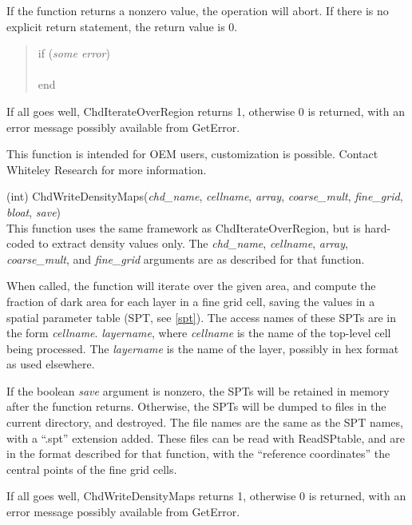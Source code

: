 \begin{description}
If the function returns a nonzero value, the operation will abort.
If there is no explicit return statement, the return value is 0.
\begin{quote}
{\vt if (}{\it some error\/}{\vt )}\\
\hspace*{2em}{\vt return 1}\\
{\vt end}
\end{quote}

If all goes well, {\vt ChdIterateOverRegion} returns 1, otherwise 0 is
returned, with an error message possibly available from {\vt
GetError}.

This function is intended for OEM users, customization is possible. 
Contact Whiteley Research for more information.

\item{(int) \vt ChdWriteDensityMaps({\it chd\_name\/}, {\it cellname\/},
 {\it array\/}, {\it coarse\_mult\/}, {\it fine\_grid\/}, {\it bloat\/},
 {\it save})}\\
This function uses the same framework as {\vt ChdIterateOverRegion},
but is hard-coded to extract density values only.  The {\it
chd\_name\/}, {\it cellname\/}, {\it array\/}, {\it coarse\_mult\/},
and {\it fine\_grid} arguments are as described for that function.

When called, the function will iterate over the given area, and
compute the fraction of dark area for each layer in a fine grid cell,
saving the values in a spatial parameter table (SPT, see \ref{spt}). 
The access names of these SPTs are in the form {\it cellname\/}.{\it
layername\/}, where {\it cellname} is the name of the top-level cell
being processed.  The {\it layername} is the name of the layer,
possibly in hex format as used elsewhere.

If the boolean {\it save} argument is nonzero, the SPTs will be
retained in memory after the function returns.  Otherwise, the SPTs
will be dumped to files in the current directory, and destroyed.  The
file names are the same as the SPT names, with a ``{\vt .spt}''
extension added.  These files can be read with {\vt ReadSPtable}, and
are in the format described for that function, with the ``reference
coordinates'' the central points of the fine grid cells.

If all goes well, {\vt ChdWriteDensityMaps} returns 1, otherwise 0 is
returned, with an error message possibly available from {\vt
GetError}.
\end{description}


